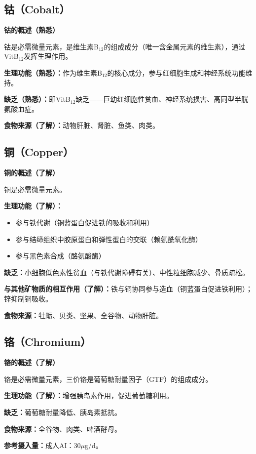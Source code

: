 \subsection{钴（Cobalt）}

\begin{defbox}
\textbf{钴的概述（熟悉）}

钴是必需微量元素，是维生素B$_{12}$的组成成分（唯一含金属元素的维生素），通过VitB$_{12}$发挥生理作用。

\textbf{生理功能（熟悉）：}作为维生素B$_{12}$的核心成分，参与红细胞生成和神经系统功能维持。

\textbf{缺乏（熟悉）：}即VitB$_{12}$缺乏——巨幼红细胞性贫血、神经系统损害、高同型半胱氨酸血症。

\textbf{食物来源（了解）：}动物肝脏、肾脏、鱼类、肉类。
\end{defbox}

\subsection{铜（Copper）}

\begin{tipbox}
\textbf{铜的概述（了解）}

铜是必需微量元素。

\textbf{生理功能（了解）：}
\begin{itemize}[leftmargin=*]
    \item 参与铁代谢（铜蓝蛋白促进铁的吸收和利用）
    \item 参与结缔组织中胶原蛋白和弹性蛋白的交联（赖氨酰氧化酶）
    \item 参与黑色素合成（酪氨酸酶）
\end{itemize}

\textbf{缺乏：}小细胞低色素性贫血（与铁代谢障碍有关）、中性粒细胞减少、骨质疏松。

\textbf{与其他矿物质的相互作用（了解）：}铁与铜协同参与造血（铜蓝蛋白促进铁利用）；锌抑制铜吸收。

\textbf{食物来源：}牡蛎、贝类、坚果、全谷物、动物肝脏。
\end{tipbox}

\subsection{铬（Chromium）}

\begin{tipbox}
\textbf{铬的概述（了解）}

铬是必需微量元素，三价铬是葡萄糖耐量因子（GTF）的组成成分。

\textbf{生理功能（了解）：}增强胰岛素作用，促进葡萄糖利用。

\textbf{缺乏：}葡萄糖耐量降低、胰岛素抵抗。

\textbf{食物来源：}全谷物、肉类、啤酒酵母。

\textbf{参考摄入量：}成人AI：30$\mu$g/d。
\end{tipbox}

